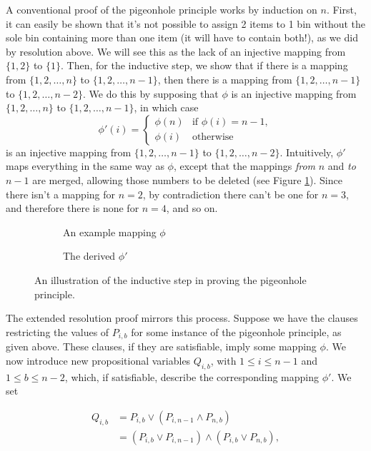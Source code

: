 \documentclass[proof,pdftex,11pt,a4,titlepage]{article}
\begin{document}
A conventional proof of the pigeonhole principle works by induction on $n$. First, it can easily be shown that it's not possible to assign 2 items to 1 bin without the sole bin containing more than one item (it will have to contain both!), as we did by resolution above. We will see this as the lack of an injective mapping from $\{1,2\}$ to $\{1\}$. Then, for the inductive step, we show that if there is a mapping from $\{1,2,\ldots,n\}$ to $\{1,2,\ldots,n-1\}$, then there is a mapping from $\{1,2,\ldots,n-1\}$ to $\{1,2,\ldots,n-2\}$. We do this by supposing that $\phi$ is an injective mapping from $\{1,2,\ldots,n\}$ to $\{1,2,\ldots,n-1\}$, in which case
\[\phi'(i) = \begin{cases}
\phi(n) & \mbox{if } \phi(i) = n-1, \\
\phi(i) & \mbox{otherwise}
\end{cases}\]
is an injective mapping from $\{1,2,\ldots,n-1\}$ to $\{1,2,\ldots,n-2\}$. Intuitively, $\phi'$ maps everything in the same way as $\phi$, except that the mappings \emph{from} $n$ and \emph{to} $n-1$ are merged, allowing those numbers to be deleted (see Figure \ref{fig:php-induction}). Since there isn't a mapping for $n=2$, by contradiction there can't be one for $n=3$, and therefore there is none for $n=4$, and so on.

\begin{figure}[h]
  \begin{subfigure}[H]{0.5\textwidth}
    
    \caption{An example mapping $\phi$}
  \end{subfigure}
  \begin{subfigure}[H]{0.5\textwidth}
    
    \caption{The derived $\phi'$}
  \end{subfigure}
  \caption{An illustration of the inductive step in proving the pigeonhole principle.}
  \label{fig:php-induction}
\end{figure}

The extended resolution proof mirrors this process. Suppose we have the clauses restricting the values of $P_{i,b}$ for some instance of the pigeonhole principle, as given above. These clauses, if they are satisfiable, imply some mapping $\phi$. We now introduce new propositional variables $Q_{i,b}$, with $1 \leq i \leq n-1$ and $1 \leq b \leq n-2$, which, if satisfiable, describe the corresponding mapping $\phi'$. We set

\begin{equation*}
  \begin{align*}
    Q_{i,b} &= P_{i,b} \vee (P_{i,n-1} \wedge P_{n,b}) \\
      &= (P_{i,b} \vee P_{i,n-1}) \wedge (P_{i,b} \vee P_{n,b}),
  \end{align*}
\end{equation*}
\end{document}
